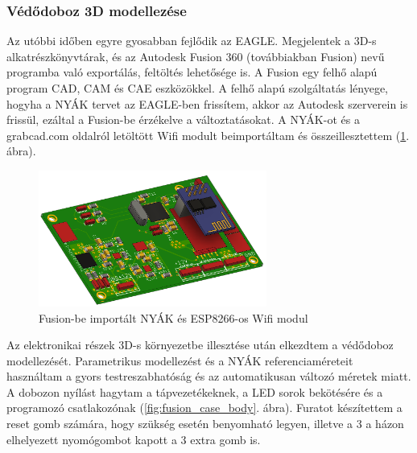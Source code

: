 \documentclass[../main.tex]{subfiles}
\begin{document}
        \subsubsection{Védődoboz 3D modellezése}
            Az utóbbi időben egyre gyosabban fejlődik az EAGLE. Megjelentek a 3D-s alkatrészkönyvtárak, és az Autodesk Fusion 360 (továbbiakban Fusion) nevű programba való exportálás, feltöltés lehetősége is. A Fusion egy felhő alapú program CAD, CAM és CAE eszközökkel. A felhő alapú szolgáltatás lényege, hogyha a NYÁK tervet az EAGLE-ben frissítem, akkor az Autodesk szerverein is frissül, ezáltal a Fusion-be érzékelve a változtatásokat.
            A NYÁK-ot és a grabcad.com oldalról letöltött Wifi modult beimportáltam és összeillesztettem (\ref{fig:fusion_pcb_esp8266}. ábra).
            
            \begin{figure}[h!]
                    \centering
                        \includegraphics[width=7.5cm]{resources/pcb_res/fusion_pcb_esp8266.png}
                    \caption{Fusion-be importált NYÁK és ESP8266-os Wifi modul}
                    \label{fig:fusion_pcb_esp8266}
            \end{figure}
            
            Az elektronikai részek 3D-s környezetbe illesztése után elkezdtem a védődoboz modellezését. Parametrikus modellezést és a NYÁK referenciaméreteit használtam a gyors testreszabhatóság és az automatikusan változó méretek miatt. A dobozon nyílást hagytam a tápvezetékeknek, a LED sorok bekötésére és a programozó csatlakozónak (\ref{fig:fusion_case_body}. ábra).  Furatot készítettem a reset gomb számára, hogy szükség esetén benyomható legyen, illetve a 3 a házon elhelyezett nyomógombot kapott a 3 extra gomb is. 
            
\end{document}
